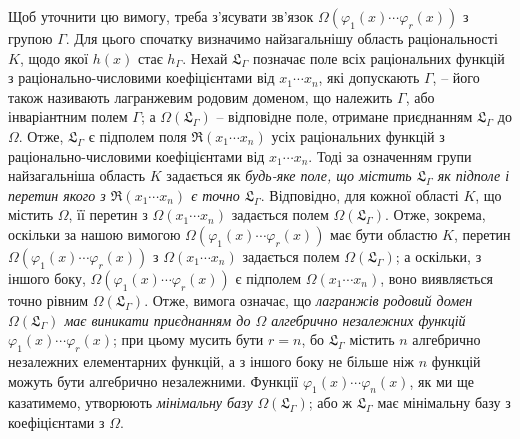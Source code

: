 \documentclass[11pt]{article}
\begin{document}
Щоб уточнити цю вимогу, треба з'ясувати зв'язок $\Omega(\varphi_1(x)\cdots\varphi_r(x))$ з групою $\Gamma$. Для цього спочатку визначимо найзагальнішу область раціональності $K$, щодо якої $h(x)$ стає $h_\Gamma$. Нехай $\mathfrak L_\Gamma$ позначає поле всіх раціональних функцій з раціонально-числовими коефіцієнтами від $x_1\cdots x_n$, які допускають $\Gamma$, -- його також називають лагранжевим родовим доменом, що належить $\Gamma$, або інваріантним полем $\Gamma$; а $\Omega(\mathfrak L_\Gamma)$ -- відповідне поле, отримане приєднанням $\mathfrak L_\Gamma$ до $\Omega$. Отже, $\mathfrak L_\Gamma$ є підполем поля $\mathfrak R(x_1\cdots x_n)$ усіх раціональних функцій з раціонально-числовими коефіцієнтами від $x_1\cdots x_n$. Тоді за означенням групи найзагальніша область $K$ задається як \emph{будь-яке поле, що містить $\mathfrak L_\Gamma$ як підполе і перетин якого з $\mathfrak R(x_1\cdots x_n)$ є точно $\mathfrak L_\Gamma$}. Відповідно, для кожної області $K$, що містить $\Omega$, її перетин з $\Omega(x_1\cdots x_n)$ задається полем $\Omega(\mathfrak L_\Gamma)$. Отже, зокрема, оскільки за нашою вимогою $\Omega(\varphi_1(x)\cdots\varphi_r(x))$ має бути областю $K$, перетин $\Omega(\varphi_1(x)\cdots\varphi_r(x))$ з $\Omega(x_1\cdots x_n)$ задається полем $\Omega(\mathfrak L_\Gamma)$; а оскільки, з іншого боку, $\Omega(\varphi_1(x)\cdots\varphi_r(x))$ є підполем $\Omega(x_1\cdots x_n)$, воно виявляється точно рівним $\Omega(\mathfrak L_\Gamma)$. Отже, вимога означає, що \emph{лагранжів родовий домен $\Omega(\mathfrak L_\Gamma)$ має виникати приєднанням до $\Omega$ алгебрично незалежних функцій $\varphi_1(x)\cdots\varphi_r(x)$}; при цьому мусить бути $r=n$, бо $\mathfrak L_\Gamma$ містить $n$ алгебрично незалежних елементарних функцій, а з іншого боку не більше ніж $n$ функцій можуть бути алгебрично незалежними. Функції $\varphi_1(x)\cdots\varphi_n(x)$, як ми ще казатимемо, утворюють \emph{мінімальну базу} $\Omega(\mathfrak L_\Gamma)$; або ж $\mathfrak L_\Gamma$ має мінімальну базу з коефіцієнтами з $\Omega$.
\end{document}
